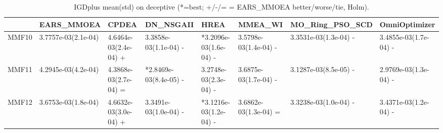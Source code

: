 \begin{table}[t]
\centering
\caption{IGDplus mean(std) on deceptive (*=best; +/-/= = EARS_MMOEA better/worse/tie, Holm).}
\label{tab:deceptive_IGDplus}
\begin{tabular}{llllllll}
\toprule
 & EARS\_MMOEA & CPDEA & DN\_NSGAII & HREA & MMEA\_WI & MO\_Ring\_PSO\_SCD & OmniOptimizer \\
\midrule
MMF10 & 3.7757e-03(2.1e-04) & 4.6464e-03(2.4e-04) + & 3.3858e-03(1.1e-04) - & *3.2096e-03(1.6e-04) - & 3.5798e-03(1.4e-04) - & 3.3531e-03(1.3e-04) - & 3.4855e-03(1.7e-04) - \\
MMF11 & 4.2945e-03(4.2e-04) & 4.3868e-03(2.7e-04) = & *2.8469e-03(8.4e-05) - & 3.2748e-03(2.3e-04) - & 3.6875e-03(1.7e-04) - & 3.1287e-03(8.5e-05) - & 2.9769e-03(1.3e-04) - \\
MMF12 & 3.6753e-03(1.8e-04) & 4.6632e-03(3.0e-04) + & 3.3491e-03(1.0e-04) - & *3.1216e-03(1.2e-04) - & 3.6862e-03(1.3e-04) = & 3.3238e-03(1.0e-04) - & 3.4371e-03(1.2e-04) - \\
\bottomrule
\end{tabular}
\end{table}
